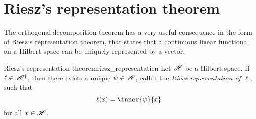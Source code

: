 \section{Riesz's representation theorem}
The orthogonal decomposition theorem has a very useful consequence in the form of Riesz's representation theorem, that states that a continuous linear functional on a Hilbert space can be uniquely represented by a vector.
\begin{theorem}{Riesz's representation theorem}{riesz_representation}
    Let \(\mathscr{H}\) be a Hilbert space. If \(\ell \in \mathscr{H}^\dag\), then there exists a unique \(\psi \in \mathscr{H}\), called the \emph{Riesz representation of \(\ell\)}, such that
    \begin{equation*}
        \ell(x) = \inner{\psi}{x}
    \end{equation*}
    for all \(x \in \mathscr{H}\).
\end{theorem}
